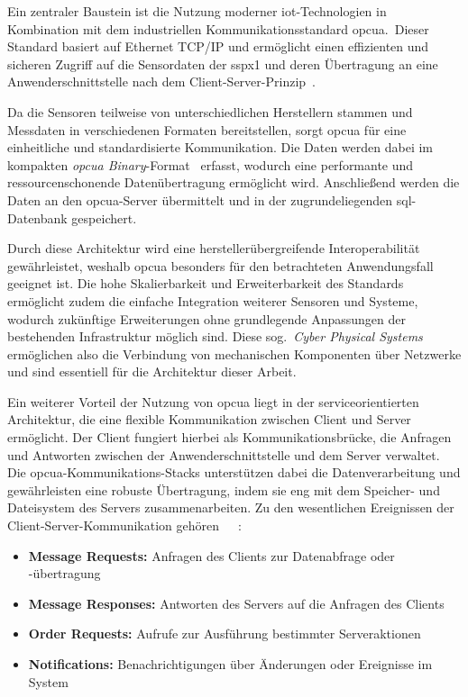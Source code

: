 Ein zentraler Baustein ist die Nutzung moderner \ac{iot}-Technologien in Kombination mit dem industriellen Kommunikationsstandard \ac{opcua}.\
Dieser Standard basiert auf Ethernet TCP/IP und ermöglicht einen effizienten und sicheren Zugriff auf die Sensordaten der \ac{sspx1} und
deren Übertragung an eine Anwenderschnittstelle nach dem Client-Server-Prinzip~\cite[S.~470]{Babel2024}.

Da die Sensoren teilweise von unterschiedlichen Herstellern stammen und Messdaten in verschiedenen Formaten bereitstellen, sorgt \ac{opcua}
für eine einheitliche und standardisierte Kommunikation. Die Daten werden dabei im kompakten \textit{\ac{opcua} Binary}-Format~\cite{iec62541}
erfasst, wodurch eine performante und ressourcenschonende Datenübertragung ermöglicht wird. Anschließend werden die Daten an den \ac{opcua}-Server
übermittelt und in der zugrundeliegenden \ac{sql}-Datenbank gespeichert. 

Durch diese Architektur wird eine herstellerübergreifende Interoperabilität gewährleistet, weshalb \ac{opcua} besonders für den betrachteten
Anwendungsfall geeignet ist. Die hohe Skalierbarkeit und Erweiterbarkeit des Standards ermöglicht zudem die einfache Integration
weiterer Sensoren und Systeme, wodurch zukünftige Erweiterungen ohne grundlegende Anpassungen der bestehenden Infrastruktur möglich
sind. Diese sog.~\textit{Cyber Physical Systems} ermöglichen also die Verbindung von mechanischen Komponenten über Netzwerke und sind
essentiell für die Architektur dieser Arbeit.

Ein weiterer Vorteil der Nutzung von \ac{opcua} liegt in der serviceorientierten Architektur, die eine flexible Kommunikation
zwischen Client und Server ermöglicht. Der Client fungiert hierbei als Kommunikationsbrücke, die Anfragen und Antworten zwischen
der Anwenderschnittstelle und dem Server verwaltet. Die \ac{opcua}-Kommunikations-Stacks unterstützen dabei die Datenverarbeitung und
gewährleisten eine robuste Übertragung, indem sie eng mit dem Speicher- und Dateisystem des Servers zusammenarbeiten. Zu den
wesentlichen Ereignissen der Client-Server-Kommunikation gehören~\cite{Babel2024}~\cite{iec62541}~\cite{Mao2024}:
\begin{itemize}
    \item \textbf{Message Requests:} Anfragen des Clients zur Datenabfrage oder -übertragung
    \item \textbf{Message Responses:} Antworten des Servers auf die Anfragen des Clients
    \item \textbf{Order Requests:} Aufrufe zur Ausführung bestimmter Serveraktionen
    \item \textbf{Notifications:} Benachrichtigungen über Änderungen oder Ereignisse im System
\end{itemize}

